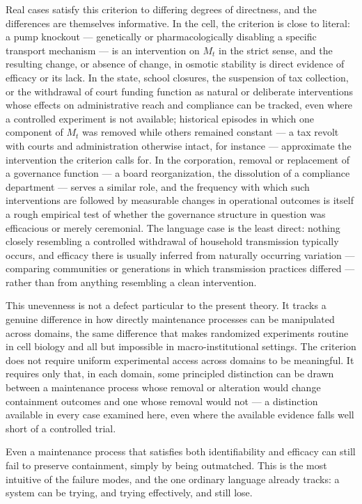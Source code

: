 \documentclass[11pt]{article}
\theoremstyle{plain}
\begin{document}
Real cases satisfy this criterion to differing degrees of directness, and the differences are themselves informative. In the cell, the criterion is close to literal: a pump knockout --- genetically or pharmacologically disabling a specific transport mechanism --- is an intervention on \(M_t\) in the strict sense, and the resulting change, or absence of change, in osmotic stability is direct evidence of efficacy or its lack. In the state, school closures, the suspension of tax collection, or the withdrawal of court funding function as natural or deliberate interventions whose effects on administrative reach and compliance can be tracked, even where a controlled experiment is not available; historical episodes in which one component of \(M_t\) was removed while others remained constant --- a tax revolt with courts and administration otherwise intact, for instance --- approximate the intervention the criterion calls for. In the corporation, removal or replacement of a governance function --- a board reorganization, the dissolution of a compliance department --- serves a similar role, and the frequency with which such interventions are followed by measurable changes in operational outcomes is itself a rough empirical test of whether the governance structure in question was efficacious or merely ceremonial. The language case is the least direct: nothing closely resembling a controlled withdrawal of household transmission typically occurs, and efficacy there is usually inferred from naturally occurring variation --- comparing communities or generations in which transmission practices differed --- rather than from anything resembling a clean intervention.

This unevenness is not a defect particular to the present theory. It tracks a genuine difference in how directly maintenance processes can be manipulated across domains, the same difference that makes randomized experiments routine in cell biology and all but impossible in macro-institutional settings. The criterion does not require uniform experimental access across domains to be meaningful. It requires only that, in each domain, some principled distinction can be drawn between a maintenance process whose removal or alteration would change containment outcomes and one whose removal would not --- a distinction available in every case examined here, even where the available evidence falls well short of a controlled trial.

Even a maintenance process that satisfies both identifiability and efficacy can still fail to preserve containment, simply by being outmatched. This is the most intuitive of the failure modes, and the one ordinary language already tracks: a system can be trying, and trying effectively, and still lose.
\end{document}
